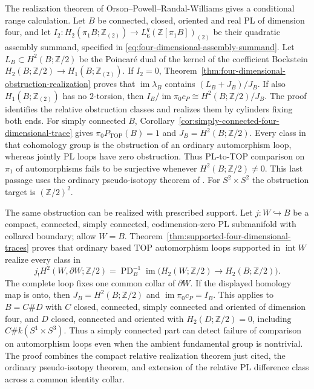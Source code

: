\documentclass[11pt,a4paper]{article}
\theoremstyle{definition}
\begin{document}
The realization theorem of Orson--Powell--Randal-Williams
\cite[Theorem~2.3(D), p.~6; Definition~5.8, p.~21]
{OrsonPowellRandalWilliams2026} gives a conditional range calculation.
Let $B$ be connected, closed, oriented and real PL of dimension four,
and let $I_2:H_2(\pi_1B;\mathbb Z_{(2)})\to
L^q_6(\mathbb Z[\pi_1B])_{(2)}$ be their quadratic assembly summand,
specified in \eqref{eq:four-dimensional-assembly-summand}.
Let $L_B\subset H^2(B;\mathbb Z/2)$ be the Poincar\'e dual of the
kernel of the coefficient Bockstein
$H_2(B;\mathbb Z/2)\to H_1(B;\mathbb Z_{(2)})$.
If $I_2=0$, Theorem~\ref{thm:four-dimensional-obstruction-realization}
proves that $\operatorname{im}\lambda_B$ contains $(L_B+J_B)/J_B$.
If also $H_1(B;\mathbb Z_{(2)})$ has no $2$-torsion, then
$I_B/\operatorname{im}\pi_0c_P\cong H^2(B;\mathbb Z/2)/J_B$.
The proof identifies the relative obstruction classes and realizes
them by cylinders fixing both ends. For simply connected $B$,
Corollary~\ref{cor:simply-connected-four-dimensional-trace} gives
$\pi_0P_{\mathrm{TOP}}(B)=1$ and $J_B=H^2(B;\mathbb Z/2)$.
Every class in that cohomology group is the obstruction of an ordinary
automorphism loop, whereas jointly PL loops have zero obstruction.
Thus PL-to-TOP comparison on $\pi_1$ of automorphisms fails to be
surjective whenever $H^2(B;\mathbb Z/2)\ne0$. This last passage uses
the ordinary pseudo-isotopy theorem of
\cite[Theorem~1.5, p.~3]{GabaiGayHartmanKrushkalPowell2026}.
For $S^2\times S^2$ the obstruction target is $(\mathbb Z/2)^2$.

The same obstruction can be realized with prescribed support.
Let $j:W\hookrightarrow B$ be a compact, connected, simply connected,
codimension-zero PL submanifold with collared boundary; allow $W=B$.
Theorem~\ref{thm:supported-four-dimensional-traces} proves that ordinary
based TOP automorphism loops supported in $\operatorname{int}W$ realize
every class in
\[
 j_!H^2(W,\partial W;\mathbb Z/2)
 =\operatorname{PD}_B^{-1}\operatorname{im}
       \bigl(H_2(W;\mathbb Z/2)\longrightarrow H_2(B;\mathbb Z/2)\bigr).
\]
The complete loop fixes one common collar of $\partial W$.
If the displayed homology map is onto, then
$J_B=H^2(B;\mathbb Z/2)$ and $\operatorname{im}\pi_0c_P=I_B$.
This applies to $B=C\#D$ with $C$ closed, connected, simply connected
and oriented of dimension four, and $D$ closed, connected and oriented
with $H_2(D;\mathbb Z/2)=0$, including $C\#k(S^1\times S^3)$.
Thus a simply connected part can detect failure of comparison on
automorphism loops even when the ambient fundamental group is nontrivial.
The proof combines the compact relative realization theorem just cited,
the ordinary pseudo-isotopy theorem, and extension of the relative
PL difference class across a common identity collar.
\end{document}
